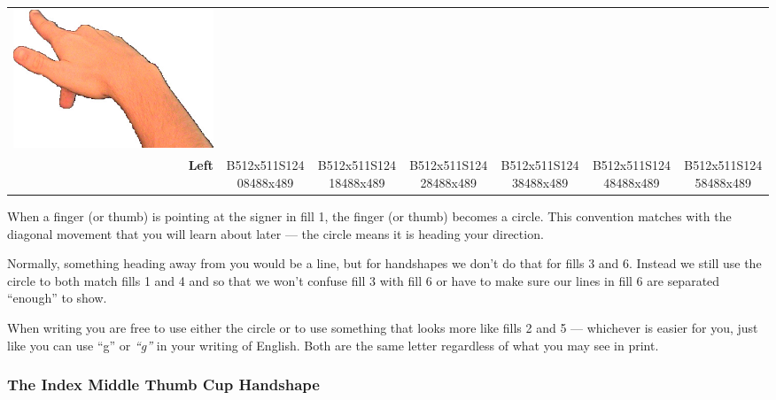 \documentclass{article}
\begin{document}
\begin{center}
\begin{tabular}{r*{6}{c}}
\includegraphics[scale=0.1]{images/03-04-6.jpg}\\
\textbf{Left}&
B512x511S12408488x489&
B512x511S12418488x489&
B512x511S12428488x489&
B512x511S12438488x489&
B512x511S12448488x489&
B512x511S12458488x489\\
\end{tabular}
\end{center}

When a finger (or thumb) is pointing at the signer in fill 1, the finger (or thumb) becomes a circle.
This convention matches with the diagonal movement that you will learn about later --- the circle means it is heading your direction.

Normally, something heading away from you would be a line, but for handshapes we don't do that for fills 3 and 6.
Instead we still use the circle to both match fills 1 and 4 and so that we won't confuse fill 3 with fill 6 or have to make sure our lines in fill 6 are separated ``enough'' to show.

When writing you are free to use either the circle or to use something that looks more like fills 2 and 5 --- whichever is easier for you, just like you can use ``g'' or {\em ``g''} in your writing of English.
Both are the same letter regardless of what you may see in print.

\subsubsection{The Index Middle Thumb Cup Handshape}
\end{document}
